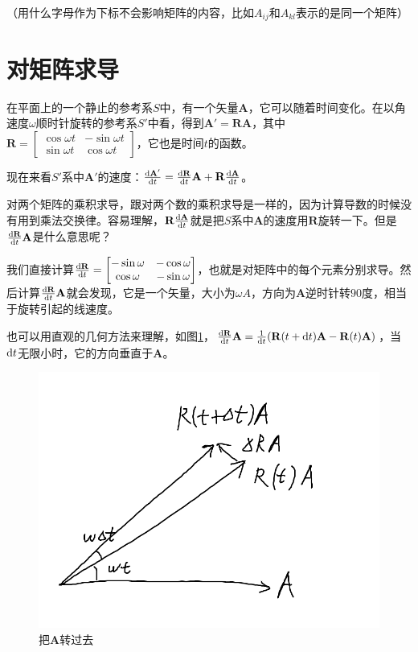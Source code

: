 （用什么字母作为下标不会影响矩阵的内容，比如$A_{i j}$和$A_{k l}$表示的是同一个矩阵）
\section{对矩阵求导}
在平面上的一个静止的参考系$S$中，有一个矢量$\mathbf{A}$，它可以随着时间变化。在以角速度$\omega$顺时针旋转的参考系$S'$中看，得到$\mathbf{A'}=\mathbf{R} \mathbf{A}$，其中$\mathbf{R}=\begin{bmatrix}
\cos \omega t & -\sin \omega t \\
\sin \omega t & \cos \omega t
\end{bmatrix}$，它也是时间$t$的函数。

现在来看$S'$系中$\mathbf{A'}$的速度：$\frac{\mathop{}\!\mathrm{d} \mathbf{A'}}{\mathop{}\!\mathrm{d} t}=\frac{\mathop{}\!\mathrm{d} \mathbf{R}}{\mathop{}\!\mathrm{d} t} \mathbf{A}+\mathbf{R} \frac{\mathop{}\!\mathrm{d} \mathbf{A}}{\mathop{}\!\mathrm{d} t}$。

对两个矩阵的乘积求导，跟对两个数的乘积求导是一样的，因为计算导数的时候没有用到乘法交换律。容易理解，$\mathbf{R} \frac{\mathop{}\!\mathrm{d} \mathbf{A}}{\mathop{}\!\mathrm{d} t}$就是把$S$系中$\mathbf{A}$的速度用$\mathbf{R}$旋转一下。但是$\frac{\mathop{}\!\mathrm{d} \mathbf{R}}{\mathop{}\!\mathrm{d} t} \mathbf{A}$是什么意思呢？

我们直接计算$\frac{\mathop{}\!\mathrm{d} \mathbf{R}}{\mathop{}\!\mathrm{d} t}=\begin{bmatrix}
-\sin \omega & -\cos \omega \\
\cos \omega & -\sin \omega
\end{bmatrix}$，也就是对矩阵中的每个元素分别求导。然后计算$\frac{\mathop{}\!\mathrm{d} \mathbf{R}}{\mathop{}\!\mathrm{d} t} \mathbf{A}$就会发现，它是一个矢量，大小为$\omega A$，方向为$\mathbf{A}$逆时针转$90$度，相当于旋转引起的线速度。

也可以用直观的几何方法来理解，如图\ref{fig-rotate-deri}，$\frac{\mathop{}\!\mathrm{d} \mathbf{R}}{\mathop{}\!\mathrm{d} t} \mathbf{A}=\frac{1}{\mathop{}\!\mathrm{d} t}(\mathbf{R}(t+\mathop{}\!\mathrm{d} t) \mathbf{A}-\mathbf{R}(t) \mathbf{A})$，当$\mathop{}\!\mathrm{d} t$无限小时，它的方向垂直于$\mathbf{A}$。
\begin{figure}[htb]
\centering
\includegraphics[scale=0.5]{fig/rotate-deri}
\caption{把$\mathbf{A}$转过去}
\label{fig-rotate-deri}
\end{figure}

